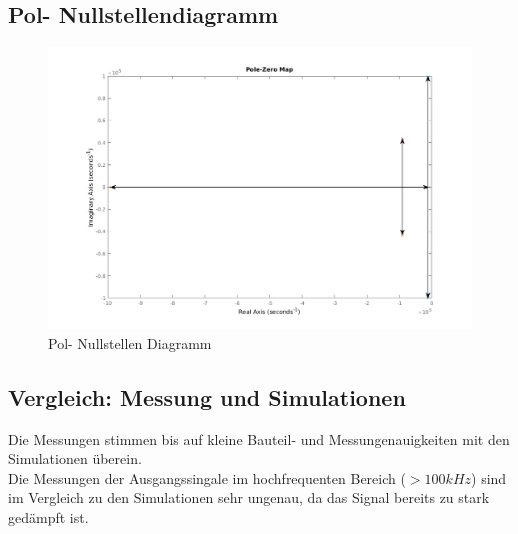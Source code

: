 \subsection{Pol- Nullstellendiagramm}

\begin{figure}[H]
  \begin{center}
    \includegraphics[width=1\textwidth]{./PoleZeroMap.png}
    \caption{Pol- Nullstellen Diagramm}
  \end{center}
\end{figure}
\noindent

\subsection{Vergleich: Messung und Simulationen}
Die Messungen stimmen bis auf kleine Bauteil- und Messungenauigkeiten mit den Simulationen \"uberein. \\
Die Messungen der Ausgangssingale im hochfrequenten Bereich ($>100kHz$) sind im Vergleich zu den Simulationen sehr ungenau, da das Signal bereits zu stark ged\"ampft ist.
